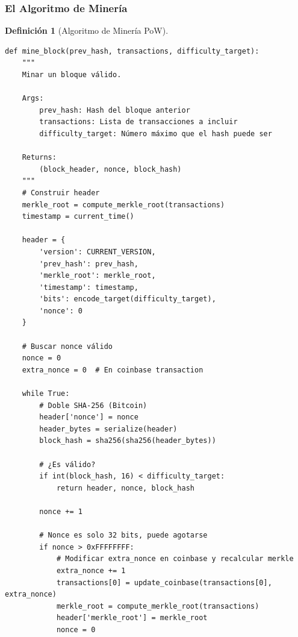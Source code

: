 \documentclass[11pt,a4paper,twoside,openright]{book}
\theoremstyle{definition}
\newtheorem{definition}{Definición}[chapter]
\theoremstyle{plain}
\theoremstyle{remark}
\begin{document}
\subsubsection{El Algoritmo de Minería}

\begin{definition}[Algoritmo de Minería PoW]
\begin{verbatim}
def mine_block(prev_hash, transactions, difficulty_target):
    """
    Minar un bloque válido.
    
    Args:
        prev_hash: Hash del bloque anterior
        transactions: Lista de transacciones a incluir
        difficulty_target: Número máximo que el hash puede ser
    
    Returns:
        (block_header, nonce, block_hash)
    """
    # Construir header
    merkle_root = compute_merkle_root(transactions)
    timestamp = current_time()
    
    header = {
        'version': CURRENT_VERSION,
        'prev_hash': prev_hash,
        'merkle_root': merkle_root,
        'timestamp': timestamp,
        'bits': encode_target(difficulty_target),
        'nonce': 0
    }
    
    # Buscar nonce válido
    nonce = 0
    extra_nonce = 0  # En coinbase transaction
    
    while True:
        # Doble SHA-256 (Bitcoin)
        header['nonce'] = nonce
        header_bytes = serialize(header)
        block_hash = sha256(sha256(header_bytes))
        
        # ¿Es válido?
        if int(block_hash, 16) < difficulty_target:
            return header, nonce, block_hash
        
        nonce += 1
        
        # Nonce es solo 32 bits, puede agotarse
        if nonce > 0xFFFFFFFF:
            # Modificar extra_nonce en coinbase y recalcular merkle
            extra_nonce += 1
            transactions[0] = update_coinbase(transactions[0], extra_nonce)
            merkle_root = compute_merkle_root(transactions)
            header['merkle_root'] = merkle_root
            nonce = 0
\end{verbatim}
\end{definition}
\end{document}
